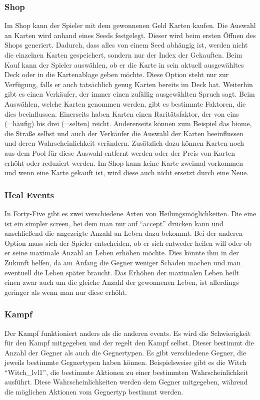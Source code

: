 \subsubsection{Shop}\label{subsubsec:shop}
Im Shop kann der Spieler mit dem gewonnenen Geld Karten kaufen.
Die Auswahl an Karten wird anhand eines Seeds festgelegt.
Dieser wird beim ersten Öffnen des Shops generiert.
Dadurch, dass alles von einem Seed abhängig ist, werden nicht die einzelnen Karten gespeichert, sondern nur der Index der Gekauften.
Beim Kauf kann der Spieler auswählen, ob er die Karte in sein aktuell ausgewähltes Deck oder in die Kartenablage geben möchte.
Diese Option steht nur zur Verfügung, falls er auch tatsächlich genug Karten bereits im Deck hat.
Weiterhin gibt es einen Verkäufer, der immer einen zufällig ausgewählten Spruch sagt.
Beim Auswählen, welche Karten genommen werden, gibt es bestimmte Faktoren, die dies beeinflussen.
Einerseits haben Karten einen Raritätsfaktor, der von eins (=häufig) bis drei (=selten) reicht.
Andererseits können zum Beispiel das biome, die Straße selbst und auch der Verkäufer die Auswahl der Karten beeinflussen und deren Wahrscheinlichkeit verändern.
Zusätzlich dazu können Karten noch aus dem Pool für diese Auswahl entfernt werden oder der Preis von Karten erhöht oder reduziert werden.
Im Shop kann keine Karte zweimal vorkommen und wenn eine Karte gekauft ist, wird diese auch nicht ersetzt durch eine Neue.

\subsubsection{Heal Events}\label{subsubsec:heal-event}
In Forty-Five gibt es zwei verschiedene Arten von Heilungsmöglichkeiten.
Die eine ist ein simpler screen, bei dem man nur auf ``accept'' drücken kann und anschließend die angezeigte Anzahl an Leben dazu bekommt.
Bei der anderen Option muss sich der Spieler entscheiden, ob er sich entweder heilen will oder ob er seine maximale Anzahl an Leben erhöhen möchte.
Dies könnte ihm in der Zukunft helfen, da am Anfang die Gegner weniger Schaden machen und man eventuell die Leben später braucht.
Das Erhöhen der maximalen Leben heilt einen zwar auch um die gleiche Anzahl der gewonnenen Leben, ist allerdings geringer als wenn man nur diese erhöht.

\subsubsection{Kampf}\label{subsubsec:kampf}
Der Kampf funktioniert anders als die anderen events.
Es wird die Schwierigkeit für den Kampf mitgegeben und der  regelt den Kampf selbst.
Dieser bestimmt die Anzahl der Gegner als auch die Gegnertypen.
Es gibt verschiedene Gegner, die jeweils bestimmte Gegnertypen haben können.
Beispielsweise gibt es die Witch ``Witch\_lvl1'', die bestimmte Aktionen zu einer bestimmten Wahrscheinlichkeit ausführt.
Diese Wahrscheinlichkeiten werden dem Gegner mitgegeben, während die möglichen Aktionen vom Gegnertyp bestimmt werden.


